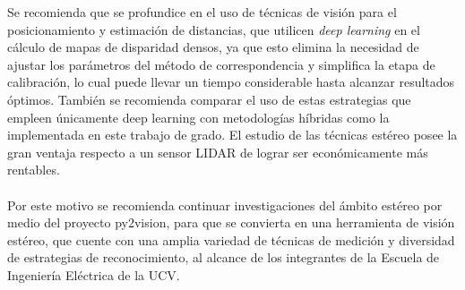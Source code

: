 Se recomienda que se profundice en el uso de técnicas de visión para el posicionamiento y estimación de distancias, que utilicen \textit{deep learning} en el cálculo de mapas de disparidad densos, ya que esto elimina la necesidad de ajustar los parámetros del método de correspondencia y simplifica la etapa de calibración, lo cual puede llevar un tiempo considerable hasta alcanzar resultados óptimos. También se recomienda comparar el uso de estas estrategias que empleen únicamente deep learning con metodologías híbridas como la implementada en este trabajo de grado. El estudio de las técnicas estéreo posee la gran ventaja respecto a un sensor LIDAR de lograr ser económicamente más rentables.
\\
\\
Por este motivo se recomienda continuar investigaciones del ámbito estéreo por medio del proyecto py2vision, para que se convierta en una herramienta de visión estéreo, que cuente con una amplia variedad de técnicas de medición y diversidad de estrategias de reconocimiento, al alcance de los integrantes de la Escuela de Ingeniería Eléctrica de la UCV.